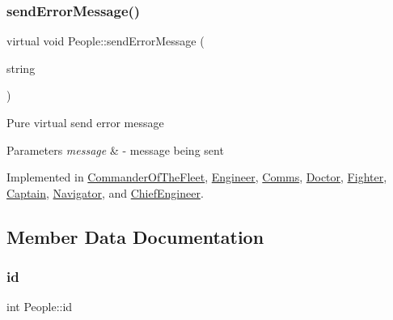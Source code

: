 \mbox{\label{classPeople_a572a35170f61d1848eb04b65baafb057}} 
\subsubsection{\texorpdfstring{send\+Error\+Message()}{sendErrorMessage()}}
{\footnotesize\ttfamily virtual void People\+::send\+Error\+Message (\begin{DoxyParamCaption}\item[{string}]{ }\end{DoxyParamCaption})\hspace{0.3cm}{\ttfamily [pure virtual]}}

Pure virtual send error message 
\begin{DoxyParams}{Parameters}
{\em message} & -\/ message being sent \\
\hline
\end{DoxyParams}


Implemented in \hyperlink{classCommanderOfTheFleet_a39cfd5c0016355543515e919791d7984}{Commander\+Of\+The\+Fleet}, \hyperlink{classEngineer_ae60806f33b7f226891dbb7ad9b8a0c0b}{Engineer}, \hyperlink{classComms_a23c37f6d10f06c7cfe25c4dc7d62fa12}{Comms}, \hyperlink{classDoctor_a5a524981ce52102f975cf9c569137ce5}{Doctor}, \hyperlink{classFighter_a42b60e52427e5c69daf141351655805c}{Fighter}, \hyperlink{classCaptain_a88abc1940bcdef8a655efc20ebd68d50}{Captain}, \hyperlink{classNavigator_a72ce12655f579879aae63b118c906b91}{Navigator}, and \hyperlink{classChiefEngineer_afe5a4677f7651fff2926c0583875a666}{Chief\+Engineer}.



\subsection{Member Data Documentation}
\mbox{\label{classPeople_ab8216a756c93da727d2626dfb063f82a}} 
\subsubsection{\texorpdfstring{id}{id}}
{\footnotesize\ttfamily int People\+::id\hspace{0.3cm}{\ttfamily [protected]}}

